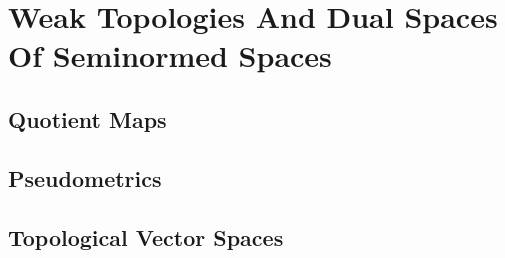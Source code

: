 \section{Weak Topologies And Dual Spaces Of Seminormed Spaces}
\subsection{Quotient Maps}





 

 





\subsection{Pseudometrics}




















\subsection{Topological Vector Spaces} 






